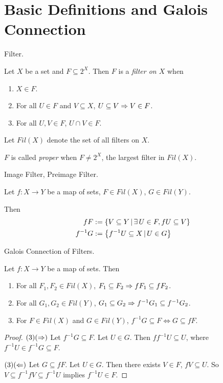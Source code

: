 \documentclass[main.tex]{subfiles}
\begin{document}
\section{Basic Definitions and Galois Connection}

\begin{dfn} Filter. 

  Let $X$ be a set and $F \subseteq 2^X$. 
  Then $F$ is a \emph{filter on $X$} when 
  \begin{enumerate}
    \item $X \in F$. 
    \item For all $U \in F$ and $V \subseteq X$, 
    $U \subseteq V \Rightarrow V \in F$.  
    \item For all $U, V \in F$, $U \cap V \in F$. 
  \end{enumerate} 
  Let $Fil(X)$ denote the set of all filters on $X$.

  $F$ is called \emph{proper} when $F \neq 2^X$,
  the largest filter in $Fil(X)$. 
\end{dfn} 

\begin{dfn} Image Filter, Preimage Filter. 

  Let $f : X \to Y$ be a map of sets, $F \in Fil(X)$, $G \in Fil(Y)$. 
  
  Then \begin{align*}
    f F &:= \left\{V \subseteq Y \,|\, \exists\,U \in F, f U \subseteq V\right\} \\
    f^{-1} G &:= \left\{f^{-1}U \subseteq X \,|\, U \in G\right\}
  \end{align*}
\end{dfn}

\begin{thm} Galois Connection of Filters. 

  Let $f : X \to Y$ be a map of sets. 
  Then \begin{enumerate}
    \item For all $F_1, F_2 \in Fil(X)$, 
    $F_1 \subseteq F_2 \Rightarrow fF_1 \subseteq fF_2$.
    \item For all $G_1, G_2 \in Fil(Y)$,
    $G_1 \subseteq G_2 \Rightarrow f^{-1}G_1 \subseteq f^{-1}G_2$. 
    \item For $F \in Fil(X)$ and $G \in Fil(Y)$, 
    $f^{-1}G \subseteq F \iff G \subseteq fF$.
  \end{enumerate}
\end{thm}
\begin{proof} 
  $(3)(\Rightarrow)$ Let $f^{-1}G \subseteq F$. Let $U \in G$. 
  Then $f f^{-1} U \subseteq U$, where $f^{-1}U \in f^{-1}G \subseteq F$. 

  $(3)(\Leftarrow)$ Let $G \subseteq fF$. Let $U \in G$.
  Then there exists $V \in F$, $fV \subseteq U$.
  So $V \subseteq f^{-1} fV \subseteq f^{-1}U$ implies $f^{-1}U \in F$.
\end{proof}
\end{document}
